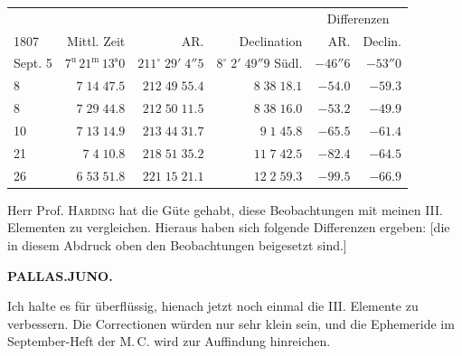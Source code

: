 \begin{center}\fontsize{9}{11}\selectfont\setlength{\tabcolsep}{2pt}\renewcommand{\arraystretch}{1.15}\begin{tabular}{lrrrrr}
& & & & \multicolumn{2}{c}{Differenzen}\\
1807 & Mittl. Zeit & AR. & Declination & AR. & Declin.\\\hline
Sept. 5 & $7^{\text{u}}\,21^{\text{m}}\,13^{\text{s}}0$ & $211^\circ\;29'\;4''5$ & $8^\circ\;2'\;49''9$ Südl. & $-46''6$ & $-53''0$\\
8 & $7\;14\;47.5$ & $212\;49\;55.4$ & $8\;38\;18.1$ & $-54.0$ & $-59.3$\\
8 & $7\;29\;44.8$ & $212\;50\;11.5$ & $8\;38\;16.0$ & $-53.2$ & $-49.9$\\
10 & $7\;13\;14.9$ & $213\;44\;31.7$ & $9\;1\;45.8$ & $-65.5$ & $-61.4$\\
21 & $7\;4\;10.8$ & $218\;51\;35.2$ & $11\;7\;42.5$ & $-82.4$ & $-64.5$\\
26 & $6\;53\;51.8$ & $221\;15\;21.1$ & $12\;2\;59.3$ & $-99.5$ & $-66.9$\\
\end{tabular}\end{center}

\par\indent Herr Prof. \textsc{Harding} hat die Güte gehabt, diese Beobachtungen mit meinen III. Elementen zu
vergleichen. Hieraus haben sich folgende Differenzen ergeben: [die in diesem Abdruck oben
den Beobachtungen beigesetzt sind.]

\clearpage
\endgroup
\begingroup
\pagestyle{empty}
\newcommand{\GaussVIGathering}[2]{%
  \fancypagestyle{gaussVIGathering}{%
    \fancyhf{}%
    \renewcommand{\headrulewidth}{0pt}%
    \renewcommand{\footrulewidth}{0pt}%
    \fancyfoot[C]{\makebox[\textwidth][l]{%
      \hspace*{.025\textwidth}{\footnotesize\bfseries #1}\hfill
      {\normalsize\bfseries\textls[90]{#2}}\hspace*{.18\textwidth}}}%
  }%
  \thispagestyle{gaussVIGathering}%
}
\thispagestyle{empty}
\noindent{}%
\makebox[12mm][l]{}%
\parbox[t]{\dimexpr\linewidth-24mm\relax}{\centering\footnotesize\bfseries PALLAS.\enspace JUNO.\par}%
\par\nobreak\medskip
\par\indent Ich halte es für überflüssig, hienach jetzt noch einmal die III. Elemente zu verbessern. Die
Correctionen würden nur sehr klein sein, und die Ephemeride im September-Heft der M.\,C. wird zur
Auffindung hinreichen.

